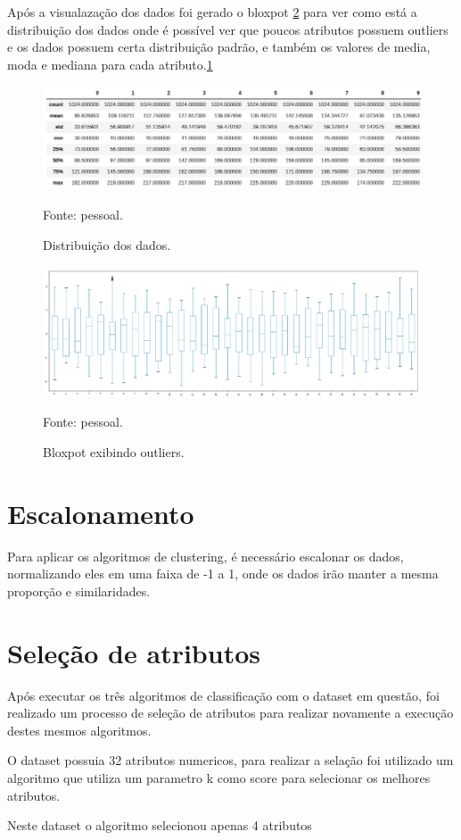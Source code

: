 Após a visualazação dos dados foi gerado o bloxpot \ref{fig:bloxpot} para ver como está a distribuição dos dados onde é possível ver que poucos atributos possuem outliers e os dados possuem certa distribuição padrão, e também os valores de media, moda e mediana para cada atributo.\ref{fig:describe}

\begin{figure}[h]
	\centering
	\includegraphics[width=0.7\linewidth]{images/describe}
	\caption{Distribuição dos dados.}
	Fonte: pessoal.
	\label{fig:describe}
\end{figure}

\begin{figure}[h]
	\centering
	\includegraphics[width=0.7\linewidth]{images/bloxpot}
	\caption{Bloxpot exibindo outliers.}
	Fonte: pessoal.
	\label{fig:bloxpot}
\end{figure}


\section{Escalonamento}
Para aplicar os algoritmos de clustering, é necessário escalonar os dados, normalizando eles em uma faixa de -1 a 1, onde os dados irão manter a mesma proporção e similaridades.


\section{Seleção de atributos}

Após executar os três algoritmos de classificação com o dataset em questão, foi realizado um processo de seleção de atributos para realizar novamente a execução destes mesmos algoritmos.

O dataset possuia 32 atributos numericos, para realizar a selação foi utilizado um algoritmo que utiliza um parametro k como score para selecionar os melhores atributos.

Neste dataset o algoritmo selecionou apenas 4 atributos
